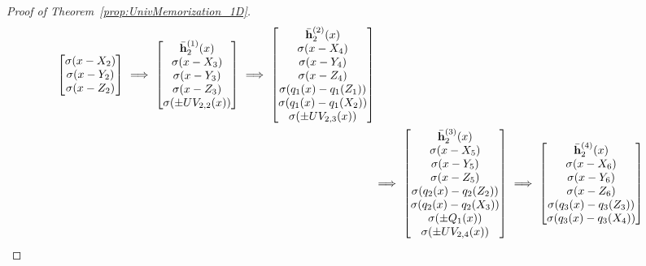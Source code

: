 \documentclass{article}
\numberwithin{equation}{section}
\theoremstyle{definition}
\begin{document}
\begin{proof}[{Proof of Theorem~\ref{prop:UnivMemorization_1D}}]
\begin{align*}
\begin{bmatrix}
        \sigma(x - X_{2})  \\  
        \sigma(x - Y_{2})  \\
        \sigma(x - Z_{2})  \\
    \end{bmatrix}
    \ \Longrightarrow \ 
    \begin{bmatrix}
        \Bar{\mathbf{h}}_2^{(1)} (x)  \\
        \sigma(x - X_{3})  \\  
        \sigma(x - Y_{3})  \\
        \sigma(x - Z_{3})  \\
        \sigma ( \pm UV_{2,2}(x) )
    \end{bmatrix}
    \ \Longrightarrow \ 
    \begin{bmatrix}
        \Bar{\mathbf{h}}_2^{(2)} (x)  \\
        \sigma(x - X_{4})  \\  
        \sigma(x - Y_{4})  \\
        \sigma(x - Z_{4})  \\
        \sigma( q_1(x) - q_1(Z_1) )  \\
        \sigma( q_1(x) - q_1(X_2) )  \\
        \sigma( \pm UV_{2,3}(x) ) 
    \end{bmatrix}
    \\
    \ &\Longrightarrow \ 
    \begin{bmatrix}
        \Bar{\mathbf{h}}_2^{(3)} (x)  \\
        \sigma(x - X_{5})  \\  
        \sigma(x - Y_{5})  \\
        \sigma(x - Z_{5})  \\
        \sigma( q_2(x) - q_2(Z_2) )  \\
        \sigma( q_2(x) - q_2(X_3) )  \\
        \sigma( \pm Q_1(x) )  \\ 
        \sigma( \pm UV_{2,4}(x) ) 
    \end{bmatrix}
    \ \Longrightarrow \
    \begin{bmatrix}
        \Bar{\mathbf{h}}_2^{(4)} (x)  \\
        \sigma(x - X_{6})  \\  
        \sigma(x - Y_{6})  \\
        \sigma(x - Z_{6})  \\
        \sigma( q_3(x) - q_3(Z_3) )  \\
        \sigma( q_3(x) - q_3(X_4) )  \\

\end{bmatrix}
\end{align*}
\end{proof}
\end{document}
